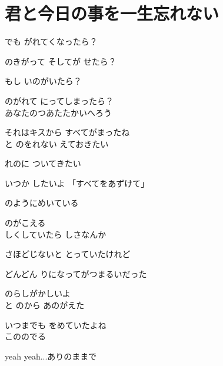\section{ 君と今日の事を一生忘れない}
\large{

でも がれてくなったら？

のきがって そしてが せたら？

もし いのがいたら？

のがれて にってしまったら？
\\

あなたのつあたたかいへろう

それはキスから すべてがまったね
\\

と のをれない えておきたい

れのに ついてきたい

いつか したいよ 「すべてをあずけて」

のようにめいている

のがこえる
\\

しくしていたら しさなんか

さほどじないと とっていたけれど

どんどん りになってがつまるいだった

のらしがかしいよ
\\

と のから あのがえた

 いつまでも をめていたよね
\\

こののでる

yeah yeah...ありのままで
\\

}

